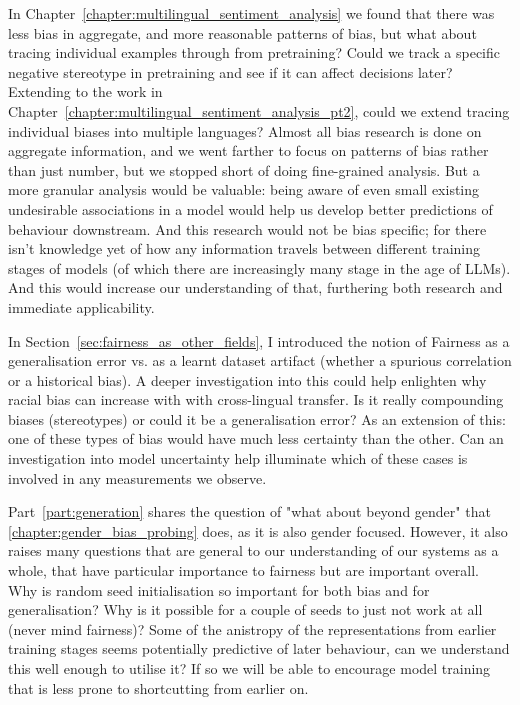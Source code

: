 In Chapter~\ref{chapter:multilingual_sentiment_analysis} we found that there was less bias in aggregate, and more reasonable patterns of bias, but what about tracing individual examples through from pretraining? Could we track a specific negative stereotype in pretraining and see if it can affect decisions later? Extending to the work in Chapter~\ref{chapter:multilingual_sentiment_analysis_pt2}, could we extend tracing individual biases into multiple languages? Almost all bias research is done on aggregate information, and we went farther to focus on patterns of bias rather than just number, but we stopped short of doing fine-grained analysis. But a more granular analysis would be valuable: being aware of even small existing undesirable associations in a model would help us develop better predictions of behaviour downstream. And this research would not be bias specific; for there isn't knowledge yet of how any information travels between different training stages of models (of which there are increasingly many stage in the age of LLMs). And this would increase our understanding of that, furthering both research and immediate applicability. 

In Section~\ref{sec:fairness_as_other_fields}, I introduced the notion of Fairness as a generalisation error vs. as a learnt dataset artifact (whether a spurious correlation or a historical bias). A deeper investigation into this could help enlighten why racial bias can increase with with cross-lingual transfer. Is it really compounding biases (stereotypes) or could it be a generalisation error? As an extension of this: one of these types of bias would have much less certainty than the other. Can an investigation into model uncertainty help illuminate which of these cases is involved in any measurements we observe.

Part~\ref{part:generation} shares the question of "what about beyond gender" that \ref{chapter:gender_bias_probing} does, as it is also gender focused. However, it also raises many questions that are general to our understanding of our systems as a whole, that have particular importance to fairness but are important overall. Why is random seed initialisation so important for both bias and for generalisation? Why is it possible for a couple of seeds to just not work at all (never mind fairness)? Some of the anistropy of the representations from earlier training stages seems potentially predictive of later behaviour, can we understand this well enough to utilise it? If so we will be able to encourage model training that is less prone to shortcutting from earlier on. 

